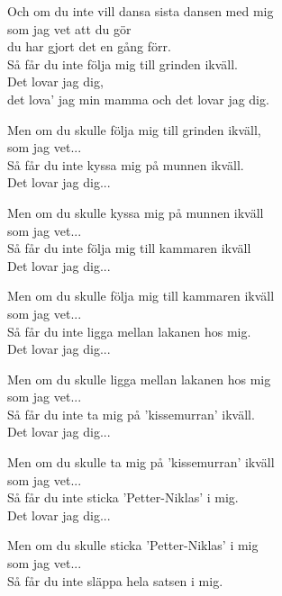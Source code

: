 \vspace{10pt}
Och om du inte vill dansa sista dansen med mig\\
som jag vet att du gör\\
du har gjort det en gång förr.\\
Så får du inte följa mig till grinden ikväll.\\
Det lovar jag dig,\\
det lova' jag min mamma och det lovar jag dig.\par
\vspace{10pt}
Men om du skulle följa mig till grinden ikväll,\\
som jag vet...\\
Så får du inte kyssa mig på munnen ikväll.\\
Det lovar jag dig...\par
\vspace{10pt}
Men om du skulle kyssa mig på munnen ikväll \\
som jag vet...\\
Så får du inte följa mig till kammaren ikväll\\
Det lovar jag dig...\par
\vspace{10pt}
Men om du skulle följa mig till kammaren ikväll\\
som jag vet...\\
Så får du inte ligga mellan lakanen hos mig.\\
Det lovar jag dig...\par
\vspace{10pt}
Men om du skulle ligga mellan lakanen hos mig\\
som jag vet...\\
Så får du inte ta mig på 'kissemurran' ikväll.\\
Det lovar jag dig...\par
\vspace{10pt}
Men om du skulle ta mig på 'kissemurran' ikväll\\
som jag vet...\\
Så får du inte sticka 'Petter-Niklas' i mig.\\
Det lovar jag dig...\par
\vspace{10pt}
Men om du skulle sticka 'Petter-Niklas' i mig\\
som jag vet...\\
Så får du inte släppa hela satsen i mig.\\
